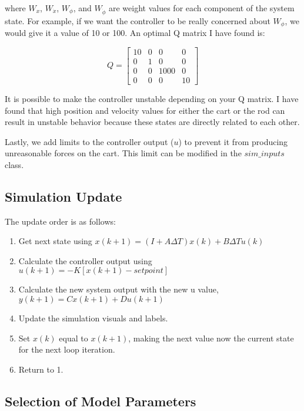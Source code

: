 \documentclass{article}
\begin{document}
\noindent where $W_x$, $W_{\Dot{x}}$,  $W_\phi$, and $W_{\Dot{\phi}}$ are weight values for each component of the system state. For example, if we want the controller to be really concerned about $W_\phi$, we would give it a value of 10 or 100. An optimal Q matrix I have found is:

\begin{equation}
    Q = 
    \begin{bmatrix}
        10 & 0 & 0 & 0 \\
        0 & 1 & 0 & 0 \\
        0 & 0 & 1000 & 0 \\
        0 & 0 & 0 & 10 
    \end{bmatrix}
\end{equation}

\noindent It is possible to make the controller unstable depending on your Q matrix. I have found that high position and velocity values for either the cart or the rod can result in unstable behavior because these states are directly related to each other.

Lastly, we add limits to the controller output ($u$) to prevent it from producing unreasonable forces on the cart. This limit can be modified in the $sim\_inputs$ class. 

\subsection{Simulation Update}

The update order is as follows:

\begin{enumerate}
    \item Get next state using $x(k+1)= (I + A\Delta T)x(k) + B\Delta T u(k)$
    \item Calculate the controller output using $u(k+1)= -K[x(k+1) - setpoint]$
    \item Calculate the new system output with the new u value, \\ $y(k+1) = Cx(k+1)+Du(k+1) $
    \item Update the simulation visuals and labels.
    \item Set $x(k)$ equal to $x(k+1)$, making the next value now the current state for the next loop iteration.
    \item Return to 1.
\end{enumerate}

\subsection{Selection of Model Parameters}
\end{document}
